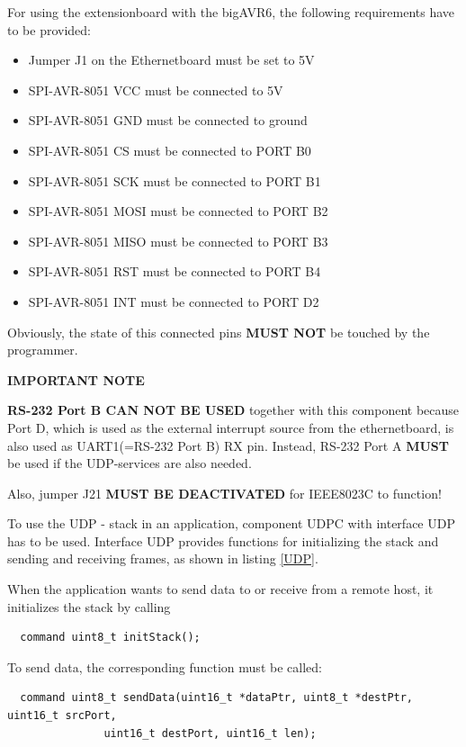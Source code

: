 For using the extensionboard with the bigAVR6, the following requirements have to be provided:

\begin{itemize}
 \item Jumper J1 on the Ethernetboard must be set to 5V
 \item SPI-AVR-8051 VCC  must be connected to 5V
 \item SPI-AVR-8051 GND  must be connected to ground
 \item SPI-AVR-8051 CS   must be connected to PORT B0
 \item SPI-AVR-8051 SCK  must be connected to PORT B1
 \item SPI-AVR-8051 MOSI must be connected to PORT B2
 \item SPI-AVR-8051 MISO must be connected to PORT B3
 \item SPI-AVR-8051 RST  must be connected to PORT B4
 \item SPI-AVR-8051 INT  must be connected to PORT D2  
\end{itemize}

Obviously, the state of this connected pins \textbf{MUST NOT} be touched by the programmer. 

\textbf{IMPORTANT NOTE}

\textbf{RS-232 Port B CAN NOT BE USED} together with this component because Port D, which is used as the external interrupt source from the ethernetboard, is also used as UART1(=RS-232 Port B) RX pin. Instead, RS-232 Port A \textbf{MUST} be used if the UDP-services are also needed.

Also, jumper J21 \textbf{MUST BE DEACTIVATED} for IEEE8023C to function!

To use the UDP - stack in an application, component UDPC with interface UDP has to be used. Interface UDP provides functions for initializing the stack and sending and receiving frames, as shown in listing \ref{UDP}.




When the application wants to send data to or receive from a remote host, it initializes the stack by calling

\begin{lstlisting}
  command uint8_t initStack();
\end{lstlisting}

To send data, the corresponding function must be called:

\begin{lstlisting}
  command uint8_t sendData(uint16_t *dataPtr, uint8_t *destPtr, uint16_t srcPort,
			   uint16_t destPort, uint16_t len);
\end{lstlisting}

